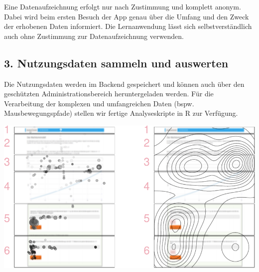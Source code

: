 \documentclass[a0,portrait]{a0poster}
\begin{document}
\begin{multicols}{2}
Eine Datenaufzeichnung erfolgt nur nach Zustimmung und komplett anonym. Dabei wird beim ersten Besuch der App genau über die Umfang und den Zweck der erhobenen Daten informiert. Die Lernanwendung lässt sich selbstverständlich auch ohne Zustimmung zur Datenaufzeichnung verwenden.


\subsection*{3. Nutzungsdaten sammeln und auswerten}

Die Nutzungsdaten werden im Backend gespeichert und können auch über den geschützten Administrationsbereich heruntergeladen werden. Für die Verarbeitung der komplexen und umfangreichen Daten (bspw. Mausbewegungspfade) stellen wir fertige Analyseskripte in R zur Verfügung.

\begin{center}\vspace{1cm}
\includegraphics[width=0.6\linewidth]{figtraj-1}
\end{center}\vspace{1cm}




%
%
%


\end{multicols}
\end{document}
